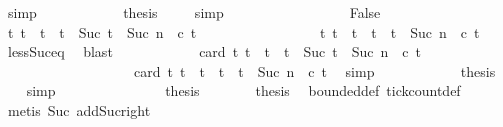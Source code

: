 \begin{isabellebody}
\ simp\isanewline
\ \ \ \ \ \ \ \ \ \ \isamarkupfalse%
\ {\isacharquery}thesis\ \isamarkupfalse%
\ {\isacharasterisk}{\isacharasterisk}\ \isamarkupfalse%
\ simp\ \isanewline
\ \ \ \ \ \ \isamarkupfalse%
\isanewline
\ \ \ \ \ \ \ \ \isamarkupfalse%
\ False\isanewline
\ \ \ \ \ \ \ \ \ \ \isamarkupfalse%
\ {\isacartoucheopen}{\isacharbraceleft}t{\isacharprime}{\isachardot}\ t\ {\isasymle}\ t{\isacharprime}\ {\isasymand}\ t{\isacharprime}\ {\isacharless}\ Suc\ {\isacharparenleft}t\ {\isacharplus}\ Suc\ n{\isacharparenright}\ {\isasymand}\ c\ t{\isacharprime}{\isacharbraceright}\isanewline
\ \ \ \ \ \ \ \ \ \ \ \ \ \ \ \ {\isacharequal}\ {\isacharbraceleft}t{\isacharprime}{\isachardot}\ t\ {\isasymle}\ t{\isacharprime}\ {\isasymand}\ t{\isacharprime}\ {\isacharless}\ t\ {\isacharplus}\ Suc\ n\ {\isasymand}\ c\ t{\isacharprime}{\isacharbraceright}{\isacartoucheclose}\ \isamarkupfalse%
\ less{\isacharunderscore}Suc{\isacharunderscore}eq\ \isamarkupfalse%
\ blast\isanewline
\ \ \ \ \ \ \ \ \ \ \isamarkupfalse%
\ {\isacartoucheopen}card\ {\isacharbraceleft}t{\isacharprime}{\isachardot}\ t\ {\isasymle}\ t{\isacharprime}\ {\isasymand}\ t{\isacharprime}\ {\isacharless}\ Suc\ {\isacharparenleft}t\ {\isacharplus}\ Suc\ n{\isacharparenright}\ {\isasymand}\ c\ t{\isacharprime}{\isacharbraceright}\isanewline
\ \ \ \ \ \ \ \ \ \ \ \ \ \ \ \ \ \ {\isacharequal}\ {\isacharparenleft}card\ {\isacharbraceleft}t{\isacharprime}{\isachardot}\ t\ {\isasymle}\ t{\isacharprime}\ {\isasymand}\ t{\isacharprime}\ {\isacharless}\ t\ {\isacharplus}\ Suc\ n\ {\isasymand}\ c\ t{\isacharprime}{\isacharbraceright}{\isacharparenright}{\isacartoucheclose}\ \isamarkupfalse%
\ simp\isanewline
\ \ \ \ \ \ \ \ \ \ \isamarkupfalse%
\ {\isacharquery}thesis\ \isamarkupfalse%
\ {\isacharasterisk}{\isacharasterisk}\ \isamarkupfalse%
\ simp\ \isanewline
\ \ \ \ \ \ \isamarkupfalse%
\isanewline
\ \ \ \ \isacommand{{\isacharbraceright}}\isamarkupfalse%
\ \isamarkupfalse%
\ {\isacharquery}thesis\ \isacommand{{\isachardot}{\isachardot}}\isamarkupfalse%
\isanewline
\ \ \isamarkupfalse%
\isanewline
\ \ \isamarkupfalse%
\ {\isacharquery}thesis\ \isamarkupfalse%
\ bounded{\isacharunderscore}def\ tick{\isacharunderscore}count{\isacharunderscore}def\isanewline
\ \ \ \ \isamarkupfalse%
\ {\isacharparenleft}metis\ Suc{\isacharunderscore}{}\ add{\isacharunderscore}Suc{\isacharunderscore}right{\isacharparenright}\isanewline

\end{isabellebody}

